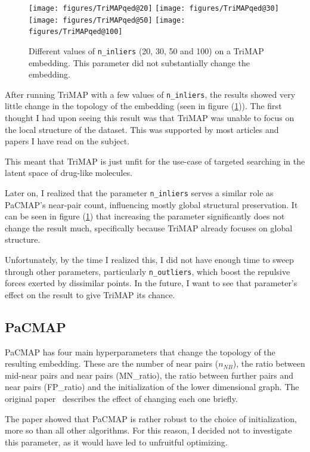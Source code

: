 \begin{figure}[!h]
	\centering
	\texttt{[image: figures/TriMAPqed@20]}
	\texttt{[image: figures/TriMAPqed@30]}
	\texttt{[image: figures/TriMAPqed@50]}
	\texttt{[image: figures/TriMAPqed@100]}
	\caption{Different values of \texttt{n\_inliers} (20, 30, 50 and 100) on a TriMAP embedding. This parameter did not substantially change the embedding.}
	\label{fig:trimap:n_inliers}
\end{figure}

After running TriMAP with a few values of \texttt{n\_inliers}, the results showed very little change in the topology of the embedding (seen in figure (\ref{fig:trimap:n_inliers})). The first thought I had upon seeing this result was that TriMAP was unable to focus on the local structure of the dataset. This was supported by most articles and papers I have read on the subject.

This meant that TriMAP is just unfit for the use-case of targeted searching in the latent space of drug-like molecules.

Later on, I realized that the parameter \texttt{n\_inliers} serves a similar role as PaCMAP's near-pair count, influencing mostly global structural preservation. It can be seen in figure (\ref{fig:trimap:n_inliers}) that increasing the parameter significantly does not change the result much, specifically because TriMAP already focuses on global structure.

Unfortunately, by the time I realized this, I did not have enough time to sweep through other parameters, particularly \texttt{n\_outliers}, which boost the repulsive forces exerted by dissimilar points. In the future, I want to see that parameter's effect on the result to give TriMAP its chance.

\subsection{PaCMAP}

PaCMAP has four main hyperparameters that change the topology of the resulting embedding. These are the number of near pairs ($n_{NB}$), the ratio between mid-near pairs and near pairs (MN\_ratio), the ratio between further pairs and near pairs (FP\_ratio) and the initialization of the lower dimensional graph. The original paper~\cite{bib:pacmap} describes the effect of changing each one briefly.

The paper showed that PaCMAP is rather robust to the choice of initialization, more so than all other algorithms. For this reason, I decided not to investigate this parameter, as it would have led to unfruitful optimizing.

